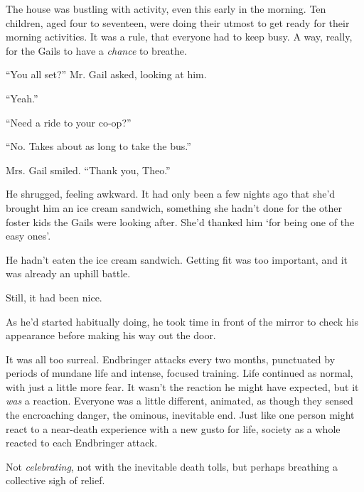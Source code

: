 





The house was bustling with activity, even this early in the morning.  Ten children, aged four to seventeen, were doing their utmost to get ready for their morning activities.  It was a rule, that everyone had to keep busy.  A way, really, for the Gails to have a \emph{chance} to breathe.



``You all set?'' Mr. Gail asked, looking at him.



``Yeah.''



``Need a ride to your co-op?''



``No.  Takes about as long to take the bus.''



Mrs. Gail smiled.  ``Thank you, Theo.''



He shrugged, feeling awkward.  It had only been a few nights ago that she'd brought him an ice cream sandwich, something she hadn't done for the other foster kids the Gails were looking after.  She'd thanked him `for being one of the easy ones'.



He hadn't eaten the ice cream sandwich.  Getting fit was too important, and it was already an uphill battle.



Still, it had been nice.



As he'd started habitually doing, he took time in front of the mirror to check his appearance before making his way out the door.



It was all too surreal.  Endbringer attacks every two months, punctuated by periods of mundane life and intense, focused training.  Life continued as normal, with just a little more fear.  It wasn't the reaction he might have expected, but it \emph{was} a reaction.  Everyone was a little different, animated, as though they sensed the encroaching danger, the ominous, inevitable end.  Just like one person might react to a near-death experience with a new gusto for life, society as a whole reacted to each Endbringer attack.



Not \emph{celebrating}, not with the inevitable death tolls, but perhaps breathing a collective sigh of relief.



